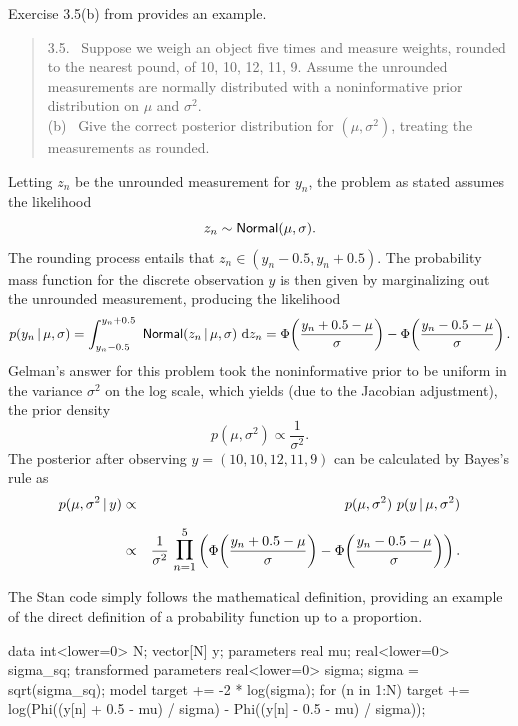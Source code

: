 Exercise 3.5(b) from \citep{GelmanEtAl:2013} provides an example.
%
\begin{quote}
  3.5. \ Suppose we weigh an object five times and measure
  weights, rounded to the nearest pound, of 10, 10, 12, 11, 9.  Assume
  the unrounded measurements are normally distributed with a
  noninformative prior distribution on $\mu$ and $\sigma^2$.
  \\[4pt]
  (b) \ Give the correct posterior distribution for $(\mu, \sigma^2)$,
  treating the measurements as rounded.
\end{quote}
%
Letting $z_n$ be the unrounded measurement for $y_n$, the problem
as stated assumes the likelihood
%
\[
z_n \sim \mbox{\sf Normal}(\mu, \sigma).
\]
%
The rounding process entails that $z_n \in (y_n - 0.5, y_n + 0.5)$.
The probability mass function for the discrete observation $y$ is then given
by marginalizing out the unrounded measurement, producing the likelihood
\[
p(y_n \, | \, \mu, \sigma)
=
\int_{y_n - 0.5}^{y_n + 0.5}
\
\mbox{\sf Normal}(z_n \, | \, \mu, \sigma)
\
\mathrm{d}z_n
=
\Phi\!\left(\frac{y_n + 0.5 - \mu}{\sigma}\right)
-
\Phi\!\left(\frac{y_n - 0.5 - \mu}{\sigma}\right).
\]
Gelman's answer for this problem took the noninformative prior to be
uniform in the variance $\sigma^2$ on the log scale, which yields (due
to the Jacobian adjustment), the prior density
\[
p(\mu, \sigma^2) \propto \frac{1}{\sigma^2}.
\]
The posterior after observing $y = (10, 10, 12, 11, 9)$ can be
calculated by Bayes's rule as
%
\begin{eqnarray*}
p(\mu, \sigma^2 \, | \, y)
& \propto &
p(\mu, \sigma^2) \ p(y \, | \, \mu, \sigma^2)
\\[6pt]
&  \propto &
\frac{1}{\sigma^2}
\
\mathlarger{\mathlarger{\prod}}_{n=1}^5
\left(
\Phi\!\left(\frac{y_n + 0.5 - \mu}{\sigma}\right)
-
\Phi\!\left(\frac{y_n - 0.5 - \mu}{\sigma}\right)
\right).
\end{eqnarray*}
%

The Stan code simply follows the mathematical definition, providing an
example of the direct definition of a probability function up to a
proportion.
%
\begin{stancode}
data {
  int<lower=0> N;
  vector[N] y;
}
parameters {
  real mu;
  real<lower=0> sigma_sq;
}
transformed parameters {
  real<lower=0> sigma;
  sigma = sqrt(sigma_sq);
}
model {
  target += -2 * log(sigma);
  for (n in 1:N)
    target += log(Phi((y[n] + 0.5 - mu) / sigma)
                  - Phi((y[n] - 0.5 - mu) / sigma));
}
\end{stancode}

